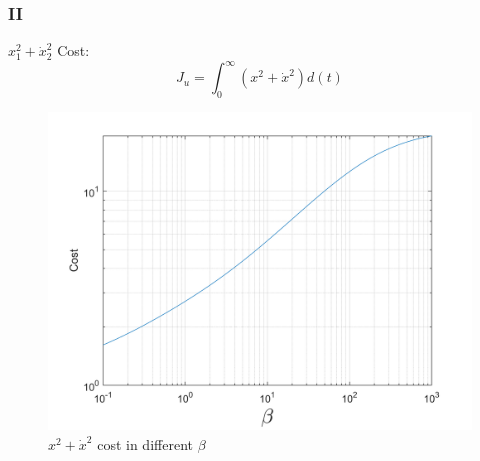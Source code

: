 \subsubsection{II}
$x_1^2 + \dot x_2^2$ Cost:
$$J_u = \int_{0}^{\infty} (x^2 + \dot{x}^2)d(t)$$
\begin{figure}[H]
	\caption{$x^2 + \dot{x}^2$ cost in different $\beta$}
	\centering
	\includegraphics[width=12cm]{../Code/Q3/figures/xCost.png}
\end{figure}